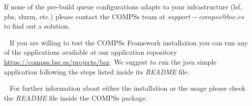 If none of the pre-build queue configurations adapts to your infrastructure (lsf, pbs, slurm, etc.) please contact 
the COMPSs team at $support-compss@bsc.es$ to find out a solution.

~ \newline
If you are willing to test the COMPSs Framework installation you can run any of the applications available at our application 
repository \url{https://compss.bsc.es/projects/bar}. We suggest to run the java simple application following the steps listed
inside its \textit{README} file. 

~ \newline
For further information about either the installation or the usage please check the \textit{README} file inside the COMPSs package. 

